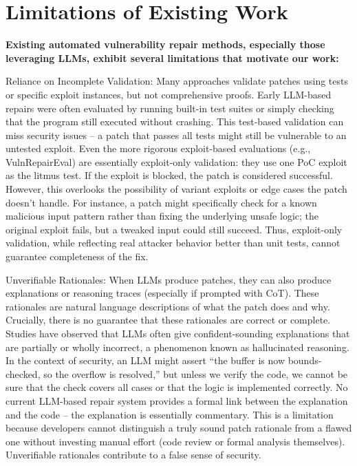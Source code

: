 \documentclass[conference,compsoc]{IEEEtran}
\begin{document}
\section{Limitations of Existing
Work}\label{limitations-of-existing-work}

\textbf{Existing automated vulnerability repair methods, especially
those leveraging LLMs, exhibit several limitations that motivate our
work:}

Reliance on Incomplete Validation: Many approaches validate patches
using tests or specific exploit instances, but not comprehensive proofs.
Early LLM-based repairs were often evaluated by running built-in test
suites or simply checking that the program still executed without
crashing. This test-based validation can miss security issues -- a patch
that passes all tests might still be vulnerable to an untested exploit.
Even the more rigorous exploit-based evaluations (e.g., VulnRepairEval)
are essentially exploit-only validation: they use one PoC exploit as the
litmus test. If the exploit is blocked, the patch is considered
successful. However, this overlooks the possibility of variant exploits
or edge cases the patch doesn't handle. For instance, a patch might
specifically check for a known malicious input pattern rather than
fixing the underlying unsafe logic; the original exploit fails, but a
tweaked input could still succeed. Thus, exploit-only validation, while
reflecting real attacker behavior better than unit tests, cannot
guarantee completeness of the fix.

Unverifiable Rationales: When LLMs produce patches, they can also
produce explanations or reasoning traces (especially if prompted with
CoT). These rationales are natural language descriptions of what the
patch does and why. Crucially, there is no guarantee that these
rationales are correct or complete. Studies have observed that LLMs
often give confident-sounding explanations that are partially or wholly
incorrect, a phenomenon known as hallucinated reasoning. In the context
of security, an LLM might assert ``the buffer is now bounds-checked, so
the overflow is resolved,'' but unless we verify the code, we cannot be
sure that the check covers all cases or that the logic is implemented
correctly. No current LLM-based repair system provides a formal link
between the explanation and the code -- the explanation is essentially
commentary. This is a limitation because developers cannot distinguish a
truly sound patch rationale from a flawed one without investing manual
effort (code review or formal analysis themselves). Unverifiable
rationales contribute to a false sense of security.
\end{document}
